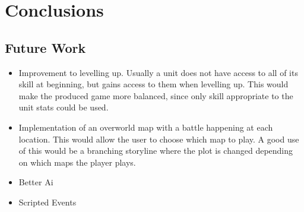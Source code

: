 \section{Conclusions}


\subsection{Future Work}
\begin{itemize}
\item Improvement to levelling up. 
	Usually a unit does not have access to all of its skill at beginning, but gains access to them when levelling up.  This would make the produced game  more balanced, since only skill appropriate to the unit stats could be used.

\item Implementation of an overworld map with a battle happening at each location. This would allow the user to choose which map to play.  A good use of this would be a branching storyline where the plot is changed depending on which maps the player plays.
 
\item  Better Ai

\item Scripted Events

\end{itemize}


